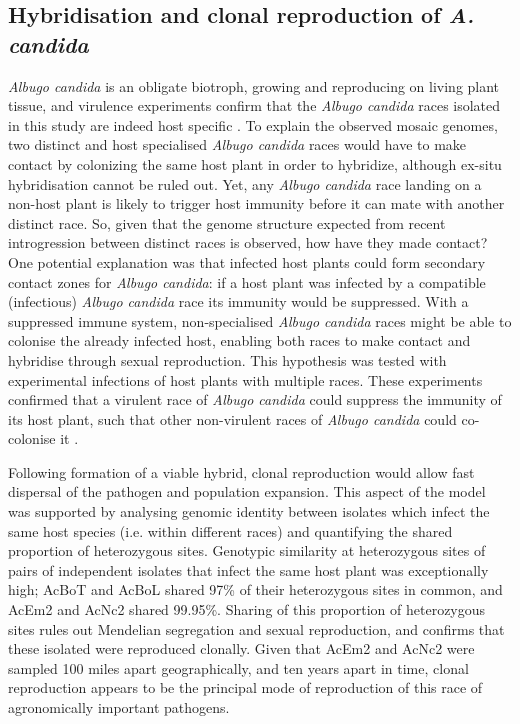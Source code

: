 \subsection{Hybridisation and clonal reproduction of \textit{A. candida}}

\textit{Albugo candida} is an obligate biotroph, growing and reproducing on living plant tissue, and virulence experiments confirm that the \textit{Albugo candida} races isolated in this study are indeed host specific \parencite{McMullan2015a}⁠.
To explain the observed mosaic genomes, two distinct and host specialised \textit{Albugo candida} races would have to make contact by colonizing the same host plant in order to hybridize, although ex-situ hybridisation cannot be ruled out. 
Yet, any \textit{Albugo candida} race landing on a non-host plant is likely to trigger host immunity before it can mate with another distinct race.
So, given that the genome structure expected from recent introgression between distinct races is observed, how have they made contact?
One potential explanation was that infected host plants could form secondary contact zones for \textit{Albugo candida}: if a host plant was infected by a compatible (infectious) \textit{Albugo candida} race its immunity would be suppressed.
With a suppressed immune system, non-specialised \textit{Albugo candida} races might be able to colonise the already infected host, enabling both races to make contact and hybridise through sexual reproduction.
This hypothesis was tested with experimental infections of host plants with multiple races.
These experiments confirmed that a virulent race of \textit{Albugo candida} could suppress the immunity of its host plant, such that other non-virulent races of \textit{Albugo candida} could co-colonise it \parencite{Cooper2008,McMullan2015a}.

Following formation of a viable hybrid, clonal reproduction would allow fast dispersal of the pathogen and population expansion.
This aspect of the model was supported by analysing genomic identity between isolates which infect the same host species (i.e. within different races) and quantifying the shared proportion of heterozygous sites.
Genotypic similarity at heterozygous sites of pairs of independent isolates that infect the same host plant was exceptionally high; AcBoT and AcBoL shared 97\% of their heterozygous sites in common, and AcEm2 and AcNc2 shared 99.95\%.
Sharing of this proportion of heterozygous sites rules out Mendelian segregation and sexual reproduction, and confirms that these isolated were reproduced clonally. 
Given that AcEm2 and AcNc2 were sampled 100 miles apart geographically, and ten years apart in time, clonal reproduction appears to be the principal mode of reproduction of this race of agronomically important pathogens. 

